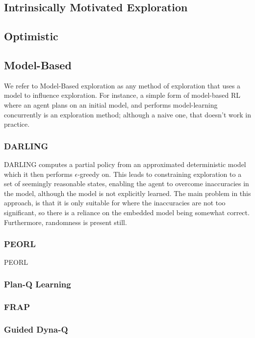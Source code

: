 \subsection{Intrinsically Motivated Exploration}
\cite{scott1996, pmlr-v97-jinnai19b, Jinnai2020Exploration}
\subsection{Optimistic}
\cite{10.1145/1390156.1390288, NIPS2006_c1b70d96, 10.1162/153244303765208377, NIPS2008_d5cfead9}
\subsection{Model-Based}
We refer to Model-Based exploration as any method of exploration that uses a model to influence exploration. For instance, a simple form of model-based RL where an agent plans on an initial model, and performs model-learning concurrently is an exploration method; although a naive one, that doesn't work in practice.\\
\cite{SARA07-jong, Littman2011EfficientME, Epshteyn2008ActiveRL}
\subsubsection{DARLING}
DARLING \cite{AIJ16-leonetti} computes a partial policy from an approximated deterministic model which it then performs $\epsilon$-greedy on. This leads to constraining exploration to a set of seemingly reasonable states, enabling the agent to overcome inaccuracies in the model, although the model is not explicitly learned. The main problem in this approach, is that it is only suitable for where the inaccuracies are not too significant, so there is a reliance on the embedded model being somewhat correct. Furthermore, randomness is present still.
\subsubsection{PEORL}
PEORL \cite{DBLP:journals/corr/abs-1804-07779}
\subsubsection{Plan-Q Learning}
\cite{10.1007/978-3-540-77949-0_6}
\subsubsection{FRAP}
\cite{DBLP:journals/corr/abs-2006-15009}
\subsubsection{Guided Dyna-Q}
\cite{Hayamizu2021GuidingRE}
